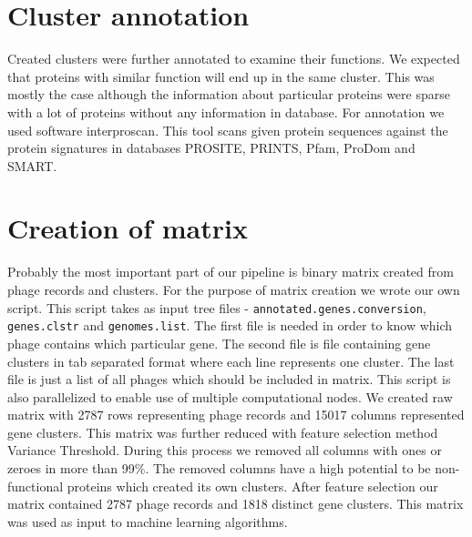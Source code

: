 \section{Cluster annotation}
Created clusters were further annotated to examine their functions.
We expected that proteins with similar function will end up in the same cluster. 
This was mostly the case although the information about particular proteins were sparse with a lot of proteins without any information in database.
For annotation we used software interproscan\cite{interpro}.
This tool scans given protein sequences against the protein signatures in databases PROSITE, PRINTS, Pfam, ProDom and SMART.

\section{Creation of matrix}
Probably the most important part of our pipeline is binary matrix created from phage records and clusters.
For the purpose of matrix creation we wrote our own script.
This script takes as input tree files - \verb|annotated.genes.conversion|, \verb|genes.clstr| and \verb|genomes.list|.
The first file is needed in order to know which phage contains which particular gene.
The second file is file containing gene clusters in tab separated format where each line represents one cluster.
The last file is just a list of all phages which should be included in matrix.
This script is also parallelized to enable use of multiple computational nodes.
We created raw matrix with 2787 rows representing phage records and 15017 columns represented gene clusters.
This matrix was further reduced with feature selection method Variance Threshold.
During this process we removed all columns with ones or zeroes in more than 99\%.
The removed columns have a high potential to be non-functional proteins which created its own clusters.
After feature selection our matrix contained 2787 phage records and 1818 distinct gene clusters.
This matrix was used as input to machine learning algorithms. 


